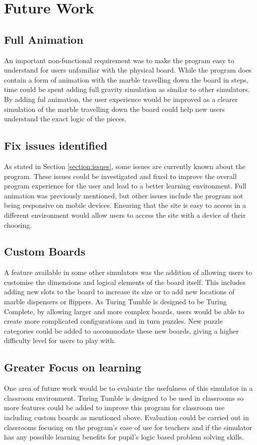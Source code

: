 \documentclass{l4proj}
\begin{document}
\section{Future Work}
\subsection{Full Animation}
An important non-functional requirement was to make the program easy to understand for users unfamiliar with the physical board. While the program does contain a form of animation with the marble travelling down the board in steps, time could be spent adding full gravity simulation as similar to other simulators. By adding ful animation, the user experience would be improved as a clearer simulation of the marble travelling down the board could help new users understand the exact logic of the pieces.

\subsection{Fix issues identified}
As stated in Section \ref{section:issues}, some issues are currently known about the program. These issues could be investigated and fixed to improve the overall program experience for the user and lead to a better learning environment. Full animation was previously mentioned, but other issues include the program not being responsive on mobile devices. Ensuring that the site is easy to access in a different environment would allow users to access the site with a device of their choosing.

\subsection{Custom Boards}
A feature available in some other simulators was the addition of allowing users to customise the dimensions and logical elements of the board itself. This includes adding new slots to the board to increase its size or to add new locations of marble dispensers or flippers. As Turing Tumble is designed to be Turing Complete, by allowing larger and more complex boards, users would be able to create more complicated configurations and in turn puzzles. New puzzle categories could be added to accommodate these new boards, giving a higher difficulty level for users to play with.  

\subsection{Greater Focus on learning}
One area of future work would be to evaluate the usefulness of this simulator in a classroom environment. Turing Tumble is designed to be used in classrooms so more features could be added to improve this program for classroom use including custom boards as mentioned above. Evaluation could be carried out in classrooms focusing on the program's ease of use for teachers and if the simulator has any possible learning benefits for pupil's logic based problem solving skills. 
\end{document}
